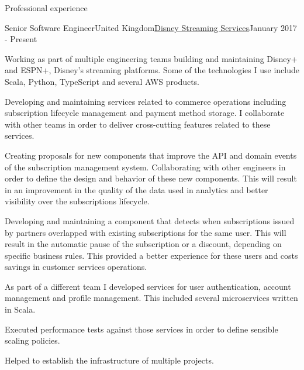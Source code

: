 \documentclass{resume} %
\begin{document}
\begin{rSection}{Professional experience}

\begin{rSubsection}{Senior Software Engineer}{United Kingdom}{\href{https://www.disneystreaming.com/}{Disney Streaming Services}}{January 2017 - Present}
\begin{rList}
\item Working as part of multiple engineering teams building and maintaining Disney+ and ESPN+, Disney’s streaming platforms. Some of the technologies I use include Scala, Python, TypeScript and several AWS products.
\item Developing and maintaining services related to commerce operations including subscription lifecycle management and payment method storage. I collaborate with other teams in order to deliver cross-cutting features related to these services.
\begin{rSublist}
  \item Creating proposals for new components that improve the API and domain events of the subscription management system. Collaborating with other engineers in order to define the design and behavior of these new components. This will result in an improvement in the quality of the data used in analytics and better visibility over the subscriptions lifecycle.
  \item Developing and maintaining a component that detects when subscriptions issued by partners overlapped with existing subscriptions for the same user. This will result in the automatic pause of the subscription or a discount, depending on specific business rules. This provided a better experience for these users and costs savings in customer services operations.
\end{rSublist}
\item As part of a different team I developed services for user authentication, account management and profile management. This included several microservices written in Scala.
\begin{rSublist}
\item Executed performance tests against those services in order to define sensible scaling policies.
\item Helped to establish the infrastructure of multiple projects.
\end{rSublist}
\end{rList}
\end{rSubsection}


\end{rSection}
\end{document}
